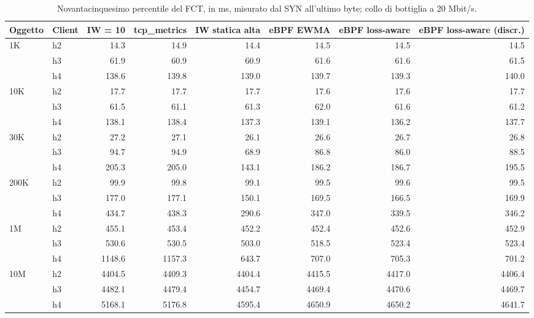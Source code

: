 \begin{table}[htbp]
  \centering
  \caption{Novantacinquesimo percentile del FCT, in ms, misurato dal SYN all'ultimo byte; collo di bottiglia a 20 Mbit/s.}
  \label{tab:fct-p95-20}
  \begin{tabular}{llrrrrrr}
    \toprule
    Oggetto & Client & IW = 10 & tcp\_metrics & IW statica alta & eBPF EWMA & eBPF loss-aware & eBPF loss-aware (discr.) \\
    \midrule
    1K & h2 & 14.3 & 14.9 & 14.4 & 14.5 & 14.5 & 14.5 \\
     & h3 & 61.9 & 60.9 & 60.9 & 61.6 & 61.6 & 61.5 \\
     & h4 & 138.6 & 139.8 & 139.0 & 139.7 & 139.3 & 140.0 \\
    \addlinespace
    10K & h2 & 17.7 & 17.7 & 17.7 & 17.6 & 17.6 & 17.7 \\
     & h3 & 61.5 & 61.1 & 61.3 & 62.0 & 61.6 & 61.2 \\
     & h4 & 138.1 & 138.4 & 137.3 & 139.1 & 136.2 & 137.7 \\
    \addlinespace
    30K & h2 & 27.2 & 27.1 & 26.1 & 26.6 & 26.7 & 26.8 \\
     & h3 & 94.7 & 94.9 & 68.9 & 86.8 & 86.0 & 88.5 \\
     & h4 & 205.3 & 205.0 & 143.1 & 186.2 & 186.7 & 195.5 \\
    \addlinespace
    200K & h2 & 99.9 & 99.8 & 99.1 & 99.5 & 99.6 & 99.5 \\
     & h3 & 177.0 & 177.1 & 150.1 & 169.5 & 166.5 & 169.9 \\
     & h4 & 434.7 & 438.3 & 290.6 & 347.0 & 339.5 & 346.2 \\
    \addlinespace
    1M & h2 & 455.1 & 453.4 & 452.2 & 452.4 & 452.6 & 452.9 \\
     & h3 & 530.6 & 530.5 & 503.0 & 518.5 & 523.4 & 523.4 \\
     & h4 & 1148.6 & 1157.3 & 643.7 & 707.0 & 705.3 & 701.2 \\
    \addlinespace
    10M & h2 & 4404.5 & 4409.3 & 4404.4 & 4415.5 & 4417.0 & 4406.4 \\
     & h3 & 4482.1 & 4479.4 & 4454.7 & 4469.4 & 4470.6 & 4469.7 \\
     & h4 & 5168.1 & 5176.8 & 4595.4 & 4650.9 & 4650.2 & 4641.7 \\
    \bottomrule
  \end{tabular}
\end{table}

